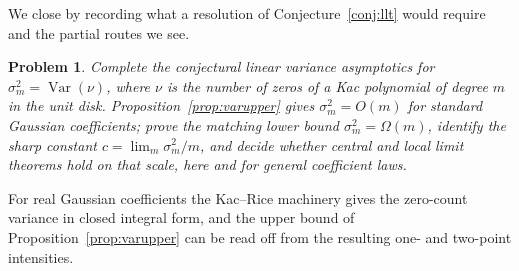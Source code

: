 \documentclass[11pt]{article}
\newtheorem{problem}[theorem]{Problem}
\begin{document}
We close by recording what a resolution of Conjecture~\ref{conj:llt} would
require and the partial routes we see.

\begin{problem}\label{prob:variance}
Complete the conjectural linear variance asymptotics for
\(\sigma_m^2=\operatorname{Var}(\nu)\), where \(\nu\) is the number of zeros of a
Kac polynomial of degree \(m\) in the unit disk.
Proposition~\ref{prop:varupper} gives \(\sigma_m^2=O(m)\) for standard Gaussian
coefficients; prove the matching lower bound \(\sigma_m^2=\Omega(m)\), identify
the sharp constant \(c=\lim_m\sigma_m^2/m\), and decide whether central and local
limit theorems hold on that scale, here and for general coefficient laws.
\end{problem}

For real Gaussian coefficients the Kac--Rice machinery gives the zero-count
variance in closed integral form, and the upper bound of
Proposition~\ref{prop:varupper} can be read off from the resulting one- and
two-point intensities.
\end{document}
